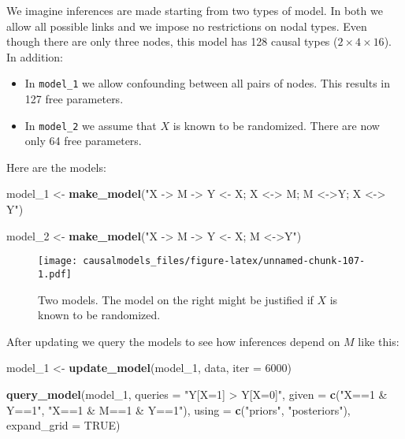 \documentclass[
  12pt,
]{book}
\newenvironment{Shaded}{\begin{snugshade}}{\end{snugshade}}
\newcommand{\DataTypeTok}[1]{\textcolor[rgb]{0.13,0.29,0.53}{#1}}
\newcommand{\DecValTok}[1]{\textcolor[rgb]{0.00,0.00,0.81}{#1}}
\newcommand{\KeywordTok}[1]{\textcolor[rgb]{0.13,0.29,0.53}{\textbf{#1}}}
\newcommand{\NormalTok}[1]{#1}
\newcommand{\OtherTok}[1]{\textcolor[rgb]{0.56,0.35,0.01}{#1}}
\newcommand{\StringTok}[1]{\textcolor[rgb]{0.31,0.60,0.02}{#1}}
\begin{document}
We imagine inferences are made starting from two types of model. In both we allow all possible links and we impose no restrictions on nodal types. Even though there are only three nodes, this model has 128 causal types (\(2\times 4 \times 16\)). In addition:

\begin{itemize}
\item
  In \texttt{model\_1} we allow confounding between all pairs of nodes. This results in 127 free parameters.
\item
  In \texttt{model\_2} we assume that \(X\) is known to be randomized. There are now only 64 free parameters.
\end{itemize}

Here are the models:

\begin{Shaded}
\begin{Highlighting}[]
\NormalTok{model_}\DecValTok{1}\NormalTok{ <-}\StringTok{ }
\StringTok{  }\KeywordTok{make_model}\NormalTok{(}\StringTok{"X -> M -> Y <- X; X <-> M; M <->Y; X <-> Y"}\NormalTok{) }

\NormalTok{model_}\DecValTok{2}\NormalTok{ <-}\StringTok{ }
\StringTok{  }\KeywordTok{make_model}\NormalTok{(}\StringTok{"X -> M -> Y <- X; M <->Y"}\NormalTok{) }
\end{Highlighting}
\end{Shaded}

\begin{figure}
\centering
\texttt{[image: causalmodels\_files/figure-latex/unnamed-chunk-107-1.pdf]}
\caption{\label{fig:unnamed-chunk-107}Two models. The model on the right might be justified if \(X\) is known to be randomized.}
\end{figure}

After updating we query the models to see how inferences depend on \(M\) like this:

\begin{Shaded}
\begin{Highlighting}[]
\NormalTok{model_}\DecValTok{1}\NormalTok{ <-}\StringTok{ }\KeywordTok{update_model}\NormalTok{(model_}\DecValTok{1}\NormalTok{, data, }\DataTypeTok{iter =} \DecValTok{6000}\NormalTok{)}

\KeywordTok{query_model}\NormalTok{(model_}\DecValTok{1}\NormalTok{, }
            \DataTypeTok{queries =} \StringTok{"Y[X=1] > Y[X=0]"}\NormalTok{,}
            \DataTypeTok{given =} \KeywordTok{c}\NormalTok{(}\StringTok{"X==1 & Y==1"}\NormalTok{, }\StringTok{"X==1 & M==1 & Y==1"}\NormalTok{),}
            \DataTypeTok{using =} \KeywordTok{c}\NormalTok{(}\StringTok{"priors"}\NormalTok{, }\StringTok{"posteriors"}\NormalTok{), }
            \DataTypeTok{expand_grid =} \OtherTok{TRUE}\NormalTok{)}
\end{Highlighting}
\end{Shaded}
\end{document}

